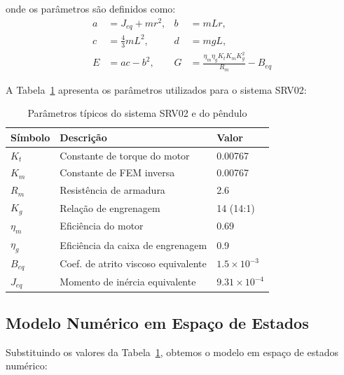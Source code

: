 \documentclass[9pt,a4paper,twocolumn,twoside]{tau-class/tau}
\begin{document}
onde os parâmetros são definidos como:
\begin{align*}
a &= J_{eq} + mr^2, & b &= mLr, \\
c &= \tfrac{4}{3} mL^2, & d &= mgL, \\
E &= ac - b^2, & G &= \tfrac{\eta_m \eta_g K_t K_m K_g^2}{R_m} - B_{eq}
\end{align*}

A Tabela~\ref{tab:parametros} apresenta os parâmetros utilizados para o sistema SRV02:

\begin{table}[H]
\centering
\caption{Parâmetros típicos do sistema SRV02 e do pêndulo}
\label{tab:parametros}
\begin{tabular}{lll}
\toprule
\textbf{Símbolo} & \textbf{Descrição} & \textbf{Valor} \\
\midrule
$K_t$ & Constante de torque do motor & 0.00767 \\
$K_m$ & Constante de FEM inversa & 0.00767 \\
$R_m$ & Resistência de armadura & 2.6 \\
$K_g$ & Relação de engrenagem & 14 (14:1) \\
$\eta_m$ & Eficiência do motor & 0.69 \\
$\eta_g$ & Eficiência da caixa de engrenagem & 0.9 \\
$B_{eq}$ & Coef. de atrito viscoso equivalente & $1.5 \times 10^{-3}$ \\
$J_{eq}$ & Momento de inércia equivalente & $9.31 \times 10^{-4}$ \\
\bottomrule
\end{tabular}
\end{table}

\subsection{Modelo Numérico em Espaço de Estados}

Substituindo os valores da Tabela~\ref{tab:parametros}, obtemos o modelo em espaço de estados numérico:
\end{document}
